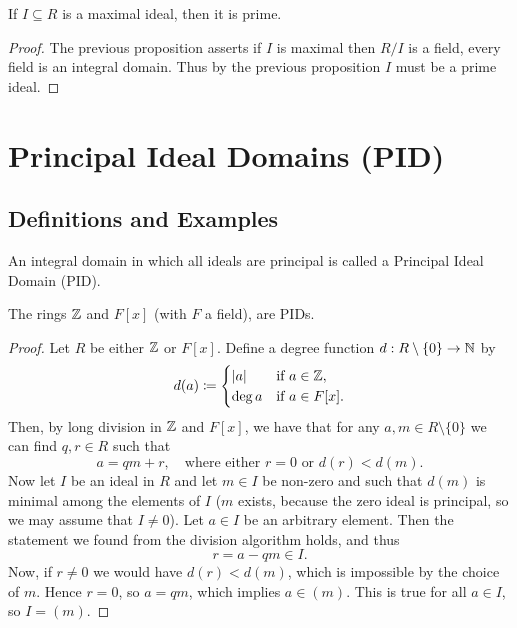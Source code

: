 \documentclass[10pt, a4paper]{article}
\begin{document}
\begin{corollary}
    If $I \subseteq R$ is a maximal ideal,
    then it is prime.

    \begin{proof}
        The previous proposition asserts if $I$ is maximal then $R / I$ is a field,
        every field is an integral domain.
        Thus by the previous proposition $I$ must be a prime ideal.
    \end{proof}
\end{corollary}

\newpage

\section{Principal Ideal Domains
    (PID)}

\subsection{Definitions and Examples}

\begin{definition}
    An integral domain in which all ideals are principal is called a Principal Ideal Domain
    (PID).
\end{definition}

\begin{theorem}
    The rings $\mathbb{Z}$ and $F[x]$
    (with $F$ a field),
    are PIDs.

    \begin{proof}
        Let $R$ be either $\mathbb{Z}$ or $F[x]$.
        Define a degree function $d : R \setminus \{0\} \to \mathbb{N}$ by
        \[
        d(a) \coloneqq \begin{cases}
            |a| &\text{if } a \in \mathbb{Z}, \\
            \deg{a} &\text{if } a \in F[x].
        \end{cases}
        \]
        Then,
        by long division in $\mathbb{Z}$ and $F[x]$,
        we have that for any $a, m \in R \setminus \{0\}$ we can find $q, r \in R$ such that
        \[
        a = qm + r,\quad\text{where either $r = 0$ or } d(r) < d(m).
        \]
        Now let $I$ be an ideal in $R$ and let $m \in I$ be non-zero and such that $d(m)$ is minimal among the elements of $I$
        ($m$ exists,
        because the zero ideal is principal,
        so we may assume that $I \neq 0$).
        Let $a \in I$ be an arbitrary element.
        Then the statement we found from the division algorithm holds,
        and thus
        \[
        r = a - qm \in I.
        \]
        Now,
        if $r \neq 0$ we would have $d(r) < d(m)$,
        which is impossible by the choice of $m$.
        Hence $r = 0$,
        so $a = qm$,
        which implies $a \in (m)$.
        This is true for all $a \in I$,
        so $I = (m)$.
    \end{proof}
\end{theorem}
\end{document}
